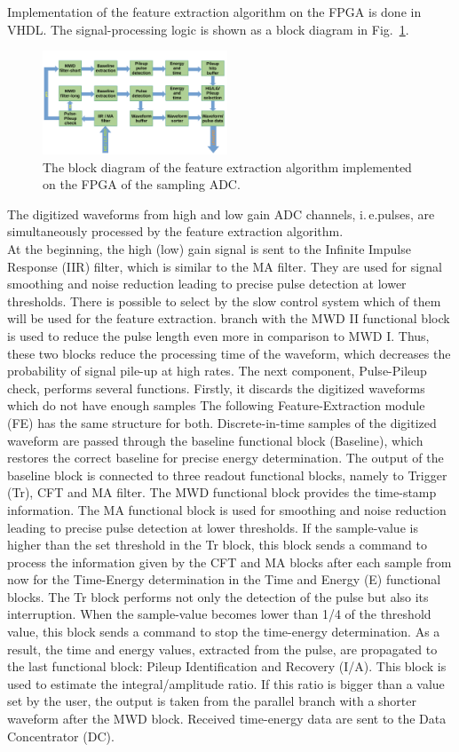 \documentclass[12pt,a4paper, twocolumn]{article}
\newcommand{\Reffig}[1]{Fig.~\ref{#1}}
\begin{document}
Implementation of the feature extraction algorithm on the FPGA is done in VHDL. The signal-processing logic is shown as a block diagram in \Reffig{fig:fea_fwendcap}. 
\begin{figure}[h]
    \includegraphics[width=0.49\textwidth ,trim={0 0 0 0}, clip]{fig/Scheme_FE.pdf}
    \caption[Scheme of the Feature Extraction Algorithm implemented on ADC]{
    The block diagram of the feature extraction algorithm implemented on the FPGA of the sampling ADC.}
    \label{fig:fea_fwendcap}
\end{figure}
The digitized waveforms from high and low gain ADC channels, i.\,e.\@ pulses, are simultaneously processed by the feature extraction algorithm. \\At the beginning, the high (low) gain signal is sent to the Infinite Impulse Response (IIR) filter, which is similar to the MA filter. They are used for signal smoothing and noise reduction leading to precise pulse detection at lower thresholds. There is possible to select by the slow control system which of them will be used for the feature extraction.  branch with the MWD II functional block is used to reduce the pulse length even more in comparison to MWD I. Thus, these two blocks reduce the processing time of the waveform, which decreases the probability of signal pile-up at high rates. 
The next component, Pulse-Pileup check, performs several functions. Firstly, it discards the digitized waveforms which do not have enough samples
The following Feature-Extraction module (FE) has the same structure for both. Discrete-in-time samples of the digitized waveform are passed through the baseline functional block (Baseline), which restores the correct baseline for precise energy determination. The output of the baseline block is connected to three readout functional blocks, namely to Trigger (Tr), CFT and MA filter.
The MWD functional block provides the time-stamp information. The MA functional block is used for smoothing and noise reduction leading to precise pulse detection at lower thresholds. If the sample-value is higher than the set threshold in the Tr block, this block sends a command to process the information given by the CFT and MA blocks after each sample from now for the Time-Energy determination in the Time and Energy (E) functional blocks. The Tr block performs not only the detection of the pulse but also its interruption. When the sample-value becomes lower than 1/4 of the threshold value, this block sends a command to stop the time-energy determination. As a result, the time and energy values, extracted from the pulse, are propagated to the last functional block: Pileup Identification and Recovery (I/A). This block is used to estimate the integral/amplitude ratio. If this ratio is bigger than a value set by the user, the output is taken from the parallel branch with a shorter 
waveform after the MWD block. Received time-energy data are sent to the Data Concentrator (DC).
\end{document}
